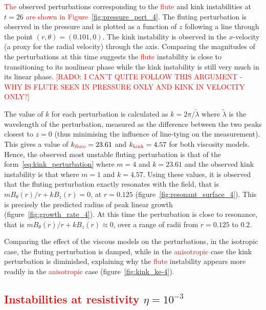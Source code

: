 \documentclass[12pt]{article}
\newcommand{\rs}[2]{\textcolor{red}{#2}}
\begin{document}
\rs{Figure~\ref{fig:pressure_pert_4} plots the }{The} observed
  perturbations corresponding to the \rs{fluting}{flute} and kink
  instabilities at $t=26$ \rs{}{are shown in
  Figure~\ref{fig:pressure_pert_4}}. The fluting perturbation is
  observed in the pressure and is plotted as a function of $z$
  following a line through the point $(r, \theta) = (0.101, 0)$. The
  kink instability is observed in the $x$-velocity (a proxy for the
  radial velocity) through the axis. Comparing the magnitudes of the
  perturbations at this time suggests the \rs{fluting}{flute}
  instability is close to transitioning to its nonlinear phase while
  the kink instability is still very much in its linear
  phase. \rs{}{[RADO: I CAN'T QUITE FOLLOW THIS ARGUMENT - WHY IS
      FLUTE SEEN IN PRESSURE ONLY AND KINK IN   VELOCITY ONLY?]}

The value of $k$ for each perturbation is calculated as $k = 2\pi/\tilde{\lambda}$ where $\tilde{\lambda}$ is the wavelength of the perturbation, measured as the difference between the two peaks closest to $z=0$ (thus minimising the influence of line-tying on the measurement). This gives a value of $k_{\rs{flute}{\text{flute}}}=23.61$ and $k_{\rs{kink}{\text{kink}}}=4.57$ for both viscosity models. Hence, the observed most unstable fluting perturbation is that of the form~\eqref{eq:kink_perturbation} where $m=4$ and $k=23.61$ and the observed kink instability is that where $m=1$ and $k=4.57$. Using these values, it is observed that the fluting perturbation exactly resonates with the field, that is $m B_{\theta}(r)/r + kB_z(r) = 0$, at $r=0.125$ (figure~\ref{fig:resonant_surface_4}). This is precisely the predicted radius of peak linear growth (figure~\ref{fig:growth_rate_4}). At this time the perturbation is close to resonance, that is $m B_{\theta}(r)/r + kB_z(r) \approx 0$, over a range of radii from $r=0.125$ to $0.2$.

Comparing the effect of the viscous models on the perturbations, in the isotropic case, the fluting perturbation is damped, while in the \rs{switching}{anisotropic} case the kink perturbation is diminished, explaining why the \rs{fluting}{flute} instability appears more readily in the \rs{switching}{anisotropic} case (figure~\ref{fig:kink_ke-4}).

\subsection{\rs{Development where}{Instabilities at resistivity} $\eta=10^{-3}$}
\end{document}
